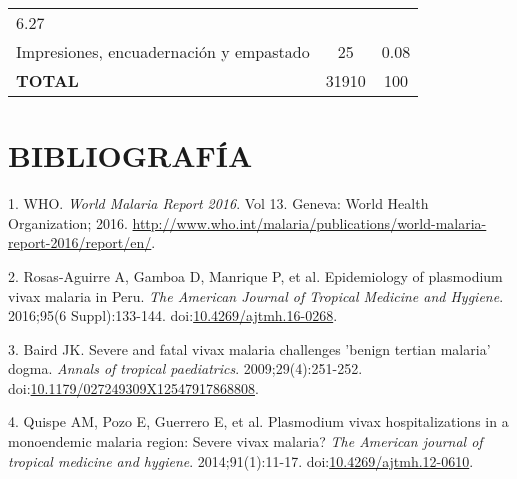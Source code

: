 \documentclass[]{article}
\begin{document}
\begin{longtable}[]{@{}lcc@{}}
\begin{minipage}[t]{0.22\columnwidth}
6.27\strut
\end{minipage}\tabularnewline
\begin{minipage}[t]{0.46\columnwidth}\raggedright\strut
Impresiones, encuadernación y empastado\strut
\end{minipage} & \begin{minipage}[t]{0.22\columnwidth}\centering\strut
25\strut
\end{minipage} & \begin{minipage}[t]{0.22\columnwidth}\centering\strut
0.08\strut
\end{minipage}\tabularnewline
\begin{minipage}[t]{0.46\columnwidth}\raggedright\strut
\textbf{TOTAL}\strut
\end{minipage} & \begin{minipage}[t]{0.22\columnwidth}\centering\strut
31910\strut
\end{minipage} & \begin{minipage}[t]{0.22\columnwidth}\centering\strut
100\strut
\end{minipage}\tabularnewline
\bottomrule
\end{longtable}

\section{BIBLIOGRAFÍA}\label{bibliografia}

\hypertarget{refs}{}
\hypertarget{ref-WHO2016world}{}
1. WHO. \emph{World Malaria Report 2016}. Vol 13. Geneva: World Health
Organization; 2016.
\url{http://www.who.int/malaria/publications/world-malaria-report-2016/report/en/}.

\hypertarget{ref-rosas2016peru}{}
2. Rosas-Aguirre A, Gamboa D, Manrique P, et al. Epidemiology of
plasmodium vivax malaria in Peru. \emph{The American Journal of Tropical
Medicine and Hygiene}. 2016;95(6 Suppl):133-144.
doi:\href{https://doi.org/10.4269/ajtmh.16-0268}{10.4269/ajtmh.16-0268}.

\hypertarget{ref-baird2009}{}
3. Baird JK. Severe and fatal vivax malaria challenges 'benign tertian
malaria' dogma. \emph{Annals of tropical paediatrics}.
2009;29(4):251-252.
doi:\href{https://doi.org/10.1179/027249309X12547917868808}{10.1179/027249309X12547917868808}.

\hypertarget{ref-quispe2014}{}
4. Quispe AM, Pozo E, Guerrero E, et al. Plasmodium vivax
hospitalizations in a monoendemic malaria region: Severe vivax malaria?
\emph{The American journal of tropical medicine and hygiene}.
2014;91(1):11-17.
doi:\href{https://doi.org/10.4269/ajtmh.12-0610}{10.4269/ajtmh.12-0610}.
\end{document}
